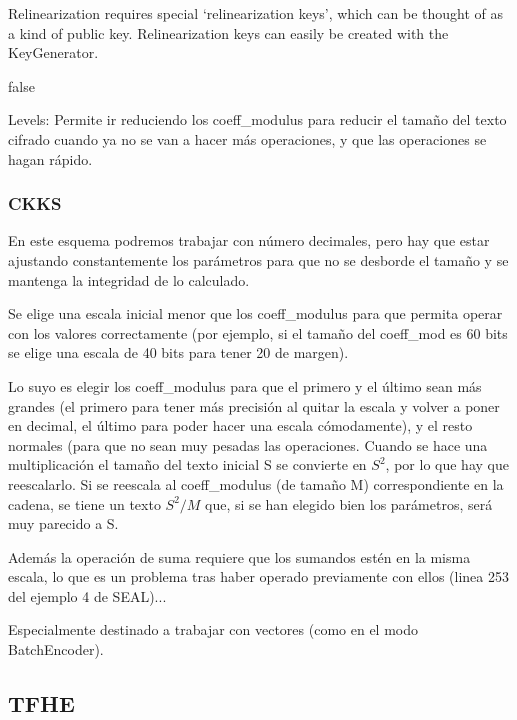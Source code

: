     Relinearization requires special `relinearization keys', which can be thought
    of as a kind of public key. Relinearization keys can easily be created with
    the KeyGenerator.
    
\fi 

\if false

Levels: Permite ir reduciendo los coeff\_modulus para reducir el tamaño del texto cifrado cuando ya no se van a hacer más operaciones, y que las operaciones se hagan rápido.

\fi

\subsubsection{CKKS}

En este esquema podremos trabajar con número decimales, pero hay que estar ajustando constantemente los parámetros para que no se desborde el tamaño y se mantenga la integridad de lo calculado. 

Se elige una escala inicial menor que los coeff\_modulus para que permita operar con los valores correctamente (por ejemplo, si el tamaño del coeff\_mod es 60 bits se elige una escala de 40 bits para tener 20 de margen). 

Lo suyo es elegir los coeff\_modulus para que el primero y el último sean más grandes (el primero para tener más precisión al quitar la escala y volver a poner en decimal, el último para poder hacer una escala cómodamente), y el resto normales (para que no sean muy pesadas las operaciones. Cuando se hace una multiplicación el tamaño del texto inicial S se convierte en $S^2$, por lo que hay que reescalarlo. Si se reescala al coeff\_modulus (de tamaño M) correspondiente en la cadena, se tiene un texto $S^2/M$ que, si se han elegido bien los parámetros, será muy parecido a S.

Además la operación de suma requiere que los sumandos estén en la misma escala, lo que es un problema tras haber operado previamente con ellos (linea 253 del ejemplo 4 de SEAL)...

Especialmente destinado a trabajar con vectores (como en el modo BatchEncoder).


\subsection{TFHE}

